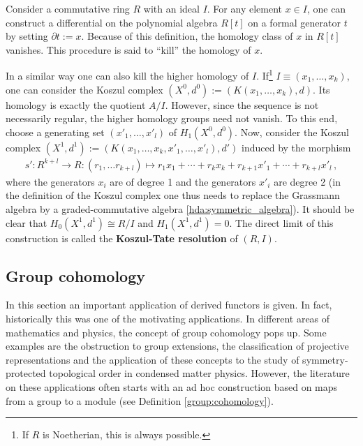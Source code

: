     \begin{property}\label{homalg:koszul_tate_resolution}
        Consider a commutative ring $R$ with an ideal $I$. For any element $x\in I$, one can construct a differential on the polynomial algebra $R[t]$ on a formal generator $t$ by setting $\partial t:=x$. Because of this definition, the homology class of $x$ in $R[t]$ vanishes. This procedure is said to ``kill'' the homology of $x$.

        In a similar way one can also kill the higher homology of $I$. If\footnote{If $R$ is Noetherian, this is always possible.} $I\equiv(x_1,\ldots,x_k)$, one can consider the Koszul complex $(X^0,d^0):=(K(x_1,\ldots,x_k),d)$. Its homology is exactly the quotient $A/I$. However, since the sequence is not necessarily regular, the higher homology groups need not vanish. To this end, choose a generating set $(x'_1,\ldots,x'_l)$ of $H_1(X^0,d^0)$. Now, consider the Koszul complex $(X^1,d^1):=(K(x_1,\ldots,x_k,x'_1,\ldots,x'_l),d')$ induced by the morphism
        \begin{gather}
            s':R^{k+l}\rightarrow R:(r_1,\ldots r_{k+l})\mapsto r_1x_1+\cdots+r_kx_k+r_{k+1}x'_1+\cdots+r_{k+l}x'_l\,,
        \end{gather}
        where the generators $x_i$ are of degree 1 and the generators $x'_i$ are degree 2 (in the definition of the Koszul complex one thus needs to replace the Grassmann algebra by a graded-commutative algebra \ref{hda:symmetric_algebra}). It should be clear that $H_0(X^1,d^1)\cong R/I$ and $H_1(X^1,d^1)=0$. The direct limit of this construction is called the \textbf{Koszul-Tate resolution} of $(R,I)$.
    \end{property}

\subsection{Group cohomology}\label{section:group_cohomology}

	In this section an important application of derived functors is given. In fact, historically this was one of the motivating applications. In different areas of mathematics and physics, the concept of group cohomology pops up. Some examples are the obstruction to group extensions, the classification of projective representations and the application of these concepts to the study of symmetry-protected topological order in condensed matter physics. However, the literature on these applications often starts with an ad hoc construction based on maps from a group to a module (see Definition \ref{group:cohomology}).

